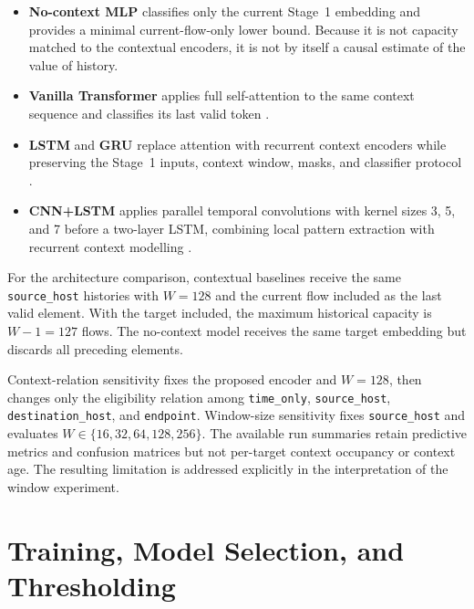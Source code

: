 \documentclass[11pt,fleqn]{report}
\begin{document}
\begin{itemize}[leftmargin=*]
    \item \textbf{No-context MLP} classifies only the current Stage~1
    embedding and provides a minimal current-flow-only lower bound. Because it
    is not capacity matched to the contextual encoders, it is not by itself a
    causal estimate of the value of history.

    \item \textbf{Vanilla Transformer} applies full self-attention to the same
    context sequence and classifies its last valid token
    \cite{Vaswani2017}.

    \item \textbf{LSTM} and \textbf{GRU} replace attention with recurrent
    context encoders while preserving the Stage~1 inputs, context window,
    masks, and classifier protocol \cite{Hochreiter1997LSTM,Cho2014GRU}.

    \item \textbf{CNN+LSTM} applies parallel temporal convolutions with kernel
    sizes 3, 5, and 7 before a two-layer LSTM, combining local pattern
    extraction with recurrent context modelling
    \cite{Kim2014CNN,Hochreiter1997LSTM}.
\end{itemize}

For the architecture comparison, contextual baselines receive the same
\texttt{source\_host} histories with $W=128$ and the current flow included as
the last valid element. With the target included, the maximum historical
capacity is $W-1=127$ flows. The no-context model receives the same target
embedding but discards all preceding elements.

Context-relation sensitivity fixes the proposed encoder and $W=128$, then
changes only the eligibility relation among \texttt{time\_only},
\texttt{source\_host}, \texttt{destination\_host}, and \texttt{endpoint}.
Window-size sensitivity fixes \texttt{source\_host} and evaluates
$W\in\{16,32,64,128,256\}$. The available run summaries retain predictive
metrics and confusion matrices but not per-target context occupancy or context
age. The resulting limitation is addressed explicitly in the interpretation of
the window experiment.

\section{Training, Model Selection, and Thresholding}
\label{subsec:experimental_training_protocol}
\end{document}
